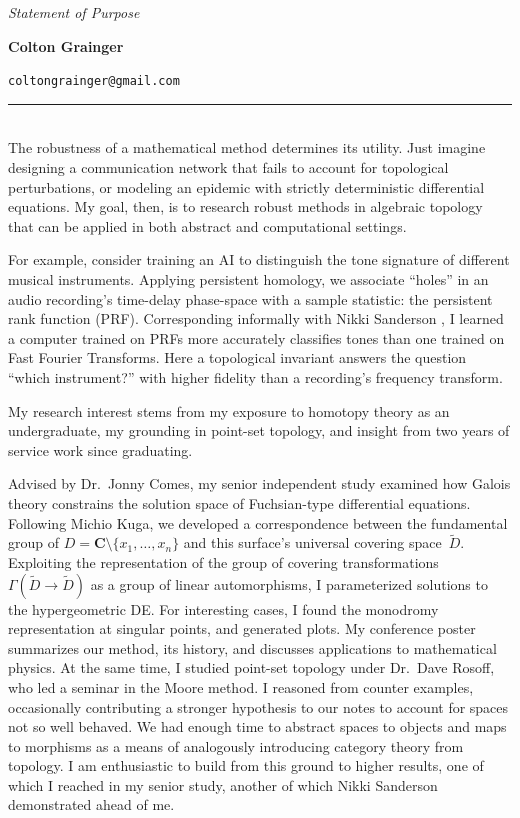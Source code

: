 \documentclass{article}
\makeatletter
\newcommand\textbox[1]{\parbox{.33\textwidth}{#1}}
\newcommand\printheader{
  \noindent 
  \textbox{\emph{Statement of Purpose}} 
  \textbox{\centerline{\large\bf Colton Grainger}} 
  \textbox{\raggedleft \texttt{coltongrainger@gmail.com}\ 
}

\vspace{-14pt} 
\noindent 
\rule{\textwidth}{1pt}\\ }
\makeatother
\begin{document}
 

\printheader

The robustness of a mathematical method determines its utility. Just imagine designing a communication network that fails to account for topological perturbations, or modeling an epidemic with strictly deterministic differential equations. My goal, then, is to research robust methods in algebraic topology that can be applied in both abstract and computational settings.

For example, consider training an AI to distinguish the tone signature of different musical instruments. Applying persistent homology, we associate ``holes'' in an audio recording's time-delay phase-space with a sample statistic: the persistent rank function (PRF). Corresponding informally with Nikki Sanderson \cite{Sanderson17}, I learned a computer trained on PRFs more accurately classifies tones than one trained on Fast Fourier Transforms. Here a topological invariant answers the question ``which instrument?'' with higher fidelity than a recording's frequency transform.

My research interest stems from my exposure to homotopy theory as an undergraduate, my grounding in point-set topology, and insight from two years of service work since graduating.

Advised by Dr.~Jonny Comes, my senior independent study examined how Galois theory constrains the solution space of Fuchsian-type differential equations. Following Michio Kuga, we developed a correspondence between the fundamental group of \(D = \mathbf{C}\setminus\{x_1,\ldots,x_n\}\) and this surface's universal covering space~\(\tilde{D}\). Exploiting the representation of the group of covering transformations \(\Gamma(\tilde{D} \to \tilde{D})\) as a group of linear automorphisms, I parameterized solutions to the hypergeometric DE. For interesting cases, I found the monodromy representation at singular points, and generated plots. My conference poster \cite{Grainger16} summarizes our method, its history, and discusses applications to mathematical physics. At the same time, I studied point-set topology under Dr.~Dave Rosoff, who led a seminar in the Moore method. I reasoned from counter examples, occasionally contributing a stronger hypothesis to our notes to account for spaces not so well behaved. We had enough time to abstract spaces to objects and maps to morphisms as a means of analogously introducing category theory from topology. I am enthusiastic to build from this ground to higher results, one of which I reached in my senior study, another of which Nikki Sanderson demonstrated ahead of me.
\end{document}
